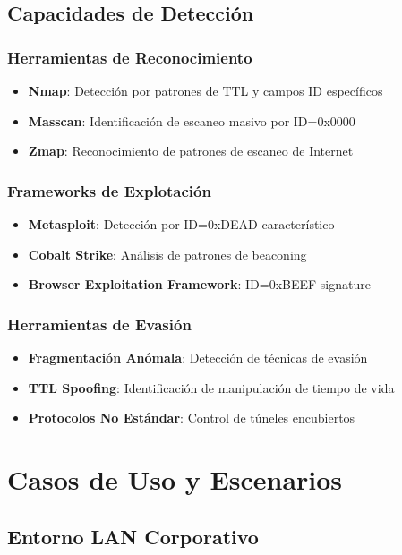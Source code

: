 \documentclass[12pt,a4paper]{article}
\begin{document}
\subsection{Capacidades de Detección}

\subsubsection{Herramientas de Reconocimiento}
\begin{itemize}
    \item \textbf{Nmap}: Detección por patrones de TTL y campos ID específicos
    \item \textbf{Masscan}: Identificación de escaneo masivo por ID=0x0000
    \item \textbf{Zmap}: Reconocimiento de patrones de escaneo de Internet
\end{itemize}

\subsubsection{Frameworks de Explotación}
\begin{itemize}
    \item \textbf{Metasploit}: Detección por ID=0xDEAD característico
    \item \textbf{Cobalt Strike}: Análisis de patrones de beaconing
    \item \textbf{Browser Exploitation Framework}: ID=0xBEEF signature
\end{itemize}

\subsubsection{Herramientas de Evasión}
\begin{itemize}
    \item \textbf{Fragmentación Anómala}: Detección de técnicas de evasión
    \item \textbf{TTL Spoofing}: Identificación de manipulación de tiempo de vida
    \item \textbf{Protocolos No Estándar}: Control de túneles encubiertos
\end{itemize}

\section{Casos de Uso y Escenarios}

\subsection{Entorno LAN Corporativo}
\end{document}
